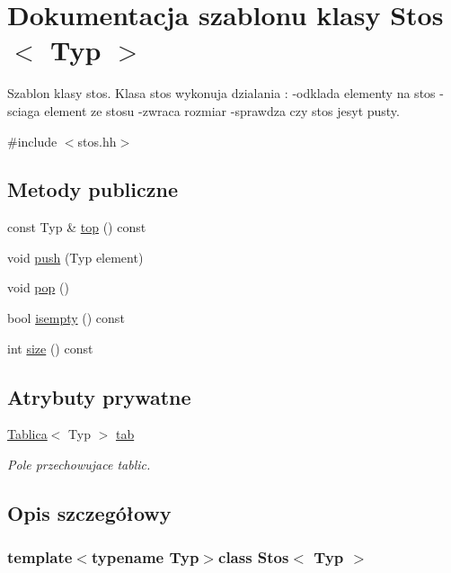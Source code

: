\hypertarget{class_stos}{\section{Dokumentacja szablonu klasy Stos$<$ Typ $>$}
\label{class_stos}
}


Szablon klasy stos. Klasa stos wykonuja dzialania \-: -\/odklada elementy na stos -\/sciaga element ze stosu -\/zwraca rozmiar -\/sprawdza czy stos jesyt pusty.  




{\ttfamily \#include $<$stos.\-hh$>$}

\subsection*{Metody publiczne}
\begin{DoxyCompactItemize}
\item 
const Typ \& \hyperlink{class_stos_a07d6df2e59cdfdac65d8f793777ff463}{top} () const 
\item 
void \hyperlink{class_stos_ae288acf023c8a1c25184dc5c6a57ee2a}{push} (Typ element)
\item 
void \hyperlink{class_stos_a38e84abe604aa6d1e9b9c6ac524a33bc}{pop} ()
\item 
bool \hyperlink{class_stos_a70aadb72c5b4728dc0c4b1e1adaa868e}{isempty} () const 
\item 
int \hyperlink{class_stos_a472d836bf51faa0264fefd08eb4224d6}{size} () const 
\end{DoxyCompactItemize}
\subsection*{Atrybuty prywatne}
\begin{DoxyCompactItemize}
\item 
\hyperlink{class_tablica}{Tablica}$<$ Typ $>$ \hyperlink{class_stos_abda1a3c37f21b8728a3fcfb4accd2108}{tab}
\begin{DoxyCompactList}\small\item\em Pole przechowujace tablic. \end{DoxyCompactList}\end{DoxyCompactItemize}


\subsection{Opis szczegółowy}
\subsubsection*{template$<$typename Typ$>$class Stos$<$ Typ $>$}



